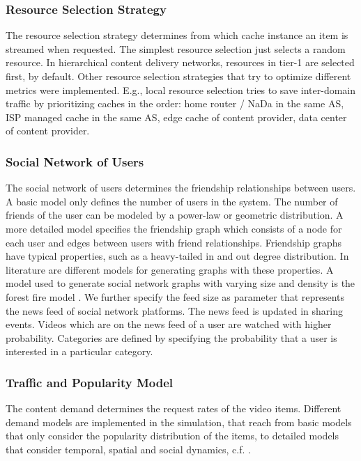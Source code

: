 \subsubsection{Resource Selection Strategy}
The resource selection strategy determines from which cache instance an item is streamed when requested.
The simplest resource selection just selects a random resource.
In hierarchical content delivery networks, resources in tier-1 are selected first, by default.
Other resource selection strategies that try to optimize different metrics were implemented.
E.g., local resource selection tries to save inter-domain traffic by prioritizing caches in the order: home router / NaDa in the same AS, ISP managed cache in the same AS, edge cache of content provider, data center of content provider.

\subsubsection{Social Network of Users}
The social network of users determines the friendship relationships between users. A basic model only defines the number of users in the system.
The number of friends of the user can be modeled by a power-law or geometric distribution.
A more detailed model specifies the friendship graph which consists of a node for each user and edges between users with friend relationships.
Friendship graphs have typical properties, such as a heavy-tailed in and out degree distribution.
In literature are different models for generating graphs with these properties.
A model used to generate social network graphs with varying size and density is the forest fire model \cite{leskovec2005graphs}.
We further specify the feed size as parameter that represents the news feed of social network platforms.
The news feed is updated in sharing events.
Videos which are on the news feed of a user are watched with higher probability.
Categories are defined by specifying the probability that a user is interested in a particular category.

\subsubsection{Traffic and Popularity Model}
The content demand determines the request rates of the video items.
Different demand models are implemented in the simulation, that reach from basic models that only consider the popularity distribution of the items, to detailed models that consider temporal, spatial and social dynamics, c.f. .

